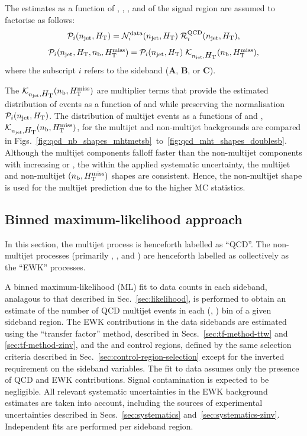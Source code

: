 The estimates as a function of \njet, \scalht, \nb, and \HTmiss of the
signal region are assumed to factorise as follows:
\begin{equation}
  \label{eq:qcd1}
  \mathcal{P}_i( n_{\text{jet}}, \mbox{$H_\text{T}$} )  =
  \mathcal{N}_i^\text{data}( n_{\text{jet}}, \mbox{$H_\text{T}$} )\;
  \mathcal{R}_i^\mathrm{QCD}( n_{\text{jet}}, \mbox{$H_\text{T}$} ),
\end{equation}
\begin{equation}
  \label{eq:qcd2}
  \mathcal{P}_i( n_{\text{jet}}, \mbox{$H_\text{T}$}, n_{\text{b}}, \mbox{$H_{\rm T}^{\rm miss}$} ) = 
  \mathcal{P}_i( n_{\text{jet}}, \mbox{$H_\text{T}$} )\;
  \mathcal{K}_{n_{\text{jet}}, \mbox{$H_\text{T}$}}( n_{\text{b}}, \mbox{$H_{\rm T}^{\rm miss}$} ), 
\end{equation}
where the subscript $i$ refers to the sideband (\textbf{A},
\textbf{B}, or \textbf{C}). 

The $\mathcal{K}_{n_{\text{jet}}, \mbox{$H_\text{T}$}}( n_{\text{b}}, \mbox{$H_{\rm T}^{\rm miss}$} )$ are multiplier
terms that provide the estimated distribution of events as a function
of \nb and \HTmiss while preserving the normalisation $\mathcal{P}_i(
n_{\text{jet}}, \mbox{$H_\text{T}$} )$. The distribution of multijet events as a functions
of \nb and \HTmiss, $\mathcal{K}_{n_{\text{jet}}, \mbox{$H_\text{T}$}}( n_{\text{b}}, \mbox{$H_{\rm T}^{\rm miss}$} )$, for
the multijet and non-multijet backgrounds are compared in 
Figs.~\ref{fig:qcd_nb_shapes_mhtmetsb}~to~\ref{fig:qcd_mht_shapes_doublesb}.
Although the multijet components falloff faster than the non-multijet
components with increasing \nb or \HTmiss, the within the applied
systematic uncertainty, the multijet and non-multijet $(n_{\text{b}}, \mbox{$H_{\rm T}^{\rm miss}$})$
shapes are consistent. Hence, the non-multijet shape is used for the
multijet prediction due to the higher MC statistics.

\subsection{Binned maximum-likelihood approach}

In this section, the multijet process is henceforth labelled as
``QCD''. The non-multijet processes (primarily \wj, \ttbar, and
\znunu) are henceforth labelled as collectively as the ``EWK''
processes.

A binned maximum-likelihood (ML) fit to data counts in each sideband,
analagous to that described in Sec.~\ref{sec:likelihood}, is performed
to obtain an estimate of the number of QCD multijet events in each
(\njet, \scalht) bin of a given sideband region. The EWK contributions
in the data sidebands are estimated using the ``transfer factor''
method, described in Secs.~\ref{sec:tf-method-ttw} and
\ref{sec:tf-method-zinv}, and the \mj and \mmj control regions,
defined by the same selection criteria described in
Sec.~\ref{sec:control-region-selection} except for the inverted
requirement on the sideband variables. The fit to data assumes only
the presence of QCD and EWK contributions. Signal contamination is
expected to be negligible. All relevant systematic uncertainties in
the EWK background estimates are taken into account, including the
sources of experimental uncertainties described in
Secs.~\ref{sec:systematics}
and~\ref{sec:systematics-zinv}. Independent fits are performed per
sideband region.

